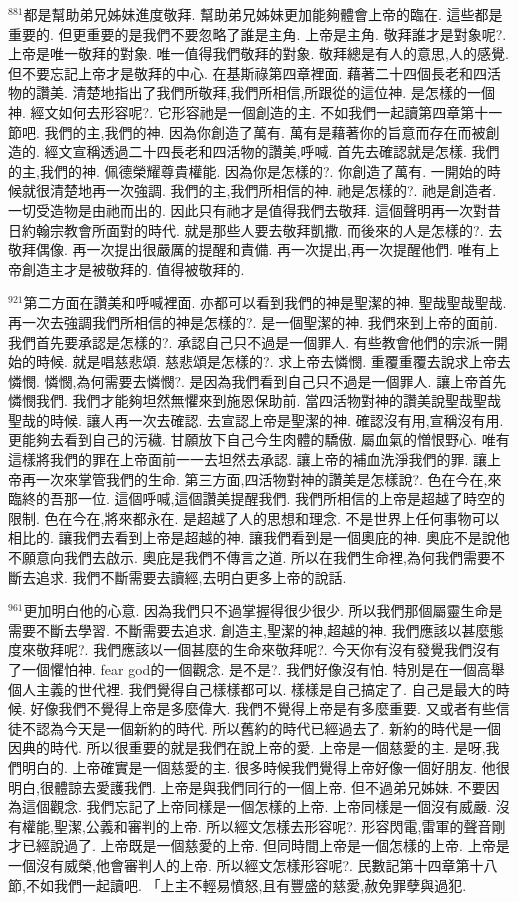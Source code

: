 \documentclass{book}
\begin{document}
$^{881}$都是幫助弟兄姊妹進度敬拜.
幫助弟兄姊妹更加能夠體會上帝的臨在.
這些都是重要的.
但更重要的是我們不要忽略了誰是主角.
上帝是主角.
敬拜誰才是對象呢?.
上帝是唯一敬拜的對象.
唯一值得我們敬拜的對象.
敬拜總是有人的意思,人的感覺.
但不要忘記上帝才是敬拜的中心.
在基斯祿第四章裡面.
藉著二十四個長老和四活物的讚美.
清楚地指出了我們所敬拜,我們所相信,所跟從的這位神.
是怎樣的一個神.
經文如何去形容呢?.
它形容祂是一個創造的主.
不如我們一起讀第四章第十一節吧.
我們的主,我們的神.
因為你創造了萬有.
萬有是藉著你的旨意而存在而被創造的.
經文宣稱透過二十四長老和四活物的讚美,呼喊.
首先去確認就是怎樣.
我們的主,我們的神.
佩德榮耀尊貴權能.
因為你是怎樣的?.
你創造了萬有.
一開始的時候就很清楚地再一次強調.
我們的主,我們所相信的神.
祂是怎樣的?.
祂是創造者.
一切受造物是由祂而出的.
因此只有祂才是值得我們去敬拜.
這個聲明再一次對昔日約翰宗教會所面對的時代.
就是那些人要去敬拜凱撒.
而後來的人是怎樣的?.
去敬拜偶像.
再一次提出很嚴厲的提醒和責備.
再一次提出,再一次提醒他們.
唯有上帝創造主才是被敬拜的.
值得被敬拜的.

$^{921}$第二方面在讚美和呼喊裡面.
亦都可以看到我們的神是聖潔的神.
聖哉聖哉聖哉.
再一次去強調我們所相信的神是怎樣的?.
是一個聖潔的神.
我們來到上帝的面前.
我們首先要承認是怎樣的?.
承認自己只不過是一個罪人.
有些教會他們的宗派一開始的時候.
就是唱慈悲頌.
慈悲頌是怎樣的?.
求上帝去憐憫.
重覆重覆去說求上帝去憐憫.
憐憫,為何需要去憐憫?.
是因為我們看到自己只不過是一個罪人.
讓上帝首先憐憫我們.
我們才能夠坦然無懼來到施恩保助前.
當四活物對神的讚美說聖哉聖哉聖哉的時候.
讓人再一次去確認.
去宣認上帝是聖潔的神.
確認沒有用,宣稱沒有用.
更能夠去看到自己的污穢.
甘願放下自己今生肉體的驕傲.
屬血氣的憎恨野心.
唯有這樣將我們的罪在上帝面前一一去坦然去承認.
讓上帝的補血洗淨我們的罪.
讓上帝再一次來掌管我們的生命.
第三方面,四活物對神的讚美是怎樣說?.
色在今在,來臨終的吾那一位.
這個呼喊,這個讚美提醒我們.
我們所相信的上帝是超越了時空的限制.
色在今在,將來都永在.
是超越了人的思想和理念.
不是世界上任何事物可以相比的.
讓我們去看到上帝是超越的神.
讓我們看到是一個奧庇的神.
奧庇不是說他不願意向我們去啟示.
奧庇是我們不傳言之道.
所以在我們生命裡,為何我們需要不斷去追求.
我們不斷需要去讀經,去明白更多上帝的說話.

$^{961}$更加明白他的心意.
因為我們只不過掌握得很少很少.
所以我們那個屬靈生命是需要不斷去學習.
不斷需要去追求.
創造主,聖潔的神,超越的神.
我們應該以甚麼態度來敬拜呢?.
我們應該以一個甚麼的生命來敬拜呢?.
今天你有沒有發覺我們沒有了一個懼怕神.
fear god的一個觀念.
是不是?.
我們好像沒有怕.
特別是在一個高舉個人主義的世代裡.
我們覺得自己樣樣都可以.
樣樣是自己搞定了.
自己是最大的時候.
好像我們不覺得上帝是多麼偉大.
我們不覺得上帝是有多麼重要.
又或者有些信徒不認為今天是一個新約的時代.
所以舊約的時代已經過去了.
新約的時代是一個因典的時代.
所以很重要的就是我們在說上帝的愛.
上帝是一個慈愛的主.
是呀,我們明白的.
上帝確實是一個慈愛的主.
很多時候我們覺得上帝好像一個好朋友.
他很明白,很體諒去愛護我們.
上帝是與我們同行的一個上帝.
但不過弟兄姊妹.
不要因為這個觀念.
我們忘記了上帝同樣是一個怎樣的上帝.
上帝同樣是一個沒有威嚴.
沒有權能,聖潔,公義和審判的上帝.
所以經文怎樣去形容呢?.
形容閃電,雷軍的聲音剛才已經說過了.
上帝既是一個慈愛的上帝.
但同時間上帝是一個怎樣的上帝.
上帝是一個沒有威榮,他會審判人的上帝.
所以經文怎樣形容呢?.
民數記第十四章第十八節,不如我們一起讀吧.
「上主不輕易憤怒,且有豐盛的慈愛,赦免罪孽與過犯.
\end{document}
